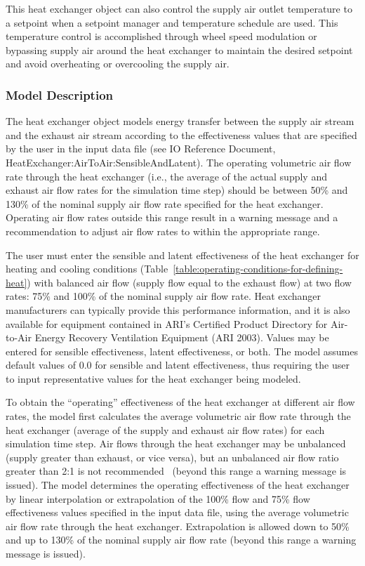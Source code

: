 This heat exchanger object can also control the supply air outlet temperature to a setpoint when a setpoint manager and temperature schedule are used. This temperature control is accomplished through wheel speed modulation or bypassing supply air around the heat exchanger to maintain the desired setpoint and avoid overheating or overcooling the supply air.

\subsubsection{Model Description}\label{model-description-011}

The heat exchanger object models energy transfer between the supply air stream and the exhaust air stream according to the effectiveness values that are specified by the user in the input data file (see IO Reference Document, HeatExchanger:AirToAir:SensibleAndLatent). The operating volumetric air flow rate through the heat exchanger (i.e., the average of the actual supply and exhaust air flow rates for the simulation time step) should be between 50\% and 130\% of the nominal supply air flow rate specified for the heat exchanger. Operating air flow rates outside this range result in a warning message and a recommendation to adjust air flow rates to within the appropriate range.

The user must enter the sensible and latent effectiveness of the heat exchanger for heating and cooling conditions (Table~\ref{table:operating-conditions-for-defining-heat}) with balanced air flow (supply flow equal to the exhaust flow) at two flow rates: 75\% and 100\% of the nominal supply air flow rate. Heat exchanger manufacturers can typically provide this performance information, and it is also available for equipment contained in ARI's Certified Product Directory for Air-to-Air Energy Recovery Ventilation Equipment (ARI 2003). Values may be entered for sensible effectiveness, latent effectiveness, or both. The model assumes default values of 0.0 for sensible and latent effectiveness, thus requiring the user to input representative values for the heat exchanger being modeled.

To obtain the ``operating'' effectiveness of the heat exchanger at different air flow rates, the model first calculates the average volumetric air flow rate through the heat exchanger (average of the supply and exhaust air flow rates) for each simulation time step. Air flows through the heat exchanger may be unbalanced (supply greater than exhaust, or vice versa), but an unbalanced air flow ratio greater than 2:1 is not recommended~ (beyond this range a warning message is issued). The model determines the operating effectiveness of the heat exchanger by linear interpolation or extrapolation of the 100\% flow and 75\% flow effectiveness values specified in the input data file, using the average volumetric air flow rate through the heat exchanger. Extrapolation is allowed down to 50\% and up to 130\% of the nominal supply air flow rate (beyond this range a warning message is issued).

